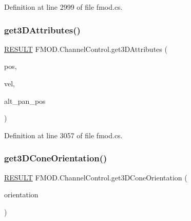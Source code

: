 Definition at line 2999 of file fmod.\+cs.

\mbox{\label{class_f_m_o_d_1_1_channel_control_abb570cc41bcd21d9df1f95ecbf113000}} 
\subsubsection{\texorpdfstring{get3\+D\+Attributes()}{get3DAttributes()}}
{\footnotesize\ttfamily \hyperlink{namespace_f_m_o_d_a305d1176ef3f8c8815861a60407ac33d}{R\+E\+S\+U\+LT} F\+M\+O\+D.\+Channel\+Control.\+get3\+D\+Attributes (\begin{DoxyParamCaption}\item[{out \hyperlink{struct_f_m_o_d_1_1_v_e_c_t_o_r}{V\+E\+C\+T\+OR}}]{pos,  }\item[{out \hyperlink{struct_f_m_o_d_1_1_v_e_c_t_o_r}{V\+E\+C\+T\+OR}}]{vel,  }\item[{out \hyperlink{struct_f_m_o_d_1_1_v_e_c_t_o_r}{V\+E\+C\+T\+OR}}]{alt\+\_\+pan\+\_\+pos }\end{DoxyParamCaption})}



Definition at line 3057 of file fmod.\+cs.

\mbox{\label{class_f_m_o_d_1_1_channel_control_a521d587b391d3e3ea5e378ab026dd04a}} 
\subsubsection{\texorpdfstring{get3\+D\+Cone\+Orientation()}{get3DConeOrientation()}}
{\footnotesize\ttfamily \hyperlink{namespace_f_m_o_d_a305d1176ef3f8c8815861a60407ac33d}{R\+E\+S\+U\+LT} F\+M\+O\+D.\+Channel\+Control.\+get3\+D\+Cone\+Orientation (\begin{DoxyParamCaption}\item[{out \hyperlink{struct_f_m_o_d_1_1_v_e_c_t_o_r}{V\+E\+C\+T\+OR}}]{orientation }\end{DoxyParamCaption})}



